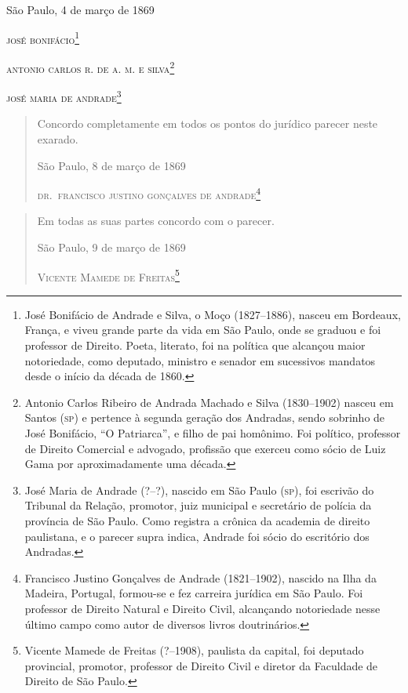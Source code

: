 \begin{flushright}
São Paulo, 4 de março de 1869

\textsc{josé bonifácio}\footnote{José Bonifácio de Andrade e Silva, o Moço
  (1827--1886), nasceu em Bordeaux, França, e viveu grande parte da vida
  em São Paulo, onde se graduou e foi professor de Direito. Poeta,
  literato, foi na política que alcançou maior notoriedade, como
  deputado, ministro e senador em sucessivos mandatos desde o início da
  década de 1860.}

\textsc{antonio carlos r. de a. m. e silva}\footnote{Antonio Carlos Ribeiro de
  Andrada Machado e Silva (1830--1902) nasceu em Santos (\textsc{sp}) e pertence à
  segunda geração dos Andradas, sendo sobrinho de José Bonifácio, ``O
  Patriarca'', e filho de pai homônimo. Foi político, professor de
  Direito Comercial e advogado, profissão que exerceu como sócio de Luiz
  Gama por aproximadamente uma década.}

\textsc{josé maria de andrade}\footnote{José Maria de Andrade (?--?),
  nascido em São Paulo (\textsc{sp}), foi escrivão do Tribunal da Relação,
  promotor, juiz municipal e secretário de polícia da província de São
  Paulo. Como registra a crônica da academia de direito paulistana, e o
  parecer supra indica, Andrade foi sócio do escritório dos Andradas.}
\end{flushright}

\begin{quote}
Concordo completamente em todos os pontos do jurídico parecer neste
exarado.

\begin{flushright}
São Paulo, 8 de março de 1869

\textsc{dr.~francisco justino gonçalves de andrade}\footnote{Francisco 
Justino Gonçalves de Andrade (1821--1902), nascido na Ilha da Madeira,
  Portugal, formou-se e fez carreira jurídica em São Paulo. Foi
  professor de Direito Natural e Direito Civil, alcançando notoriedade
  nesse último campo como autor de diversos livros doutrinários.}
  \end{flushright}
\end{quote}  

\begin{quote}
Em todas as suas partes concordo com o parecer.

\begin{flushright}
São Paulo, 9 de março de 1869

\textsc{Vicente Mamede de Freitas}\footnote{Vicente Mamede de Freitas
  (?--1908), paulista da capital, foi deputado provincial, promotor,
  professor de Direito Civil e diretor da Faculdade de Direito de São
  Paulo.}
  \end{flushright}
\end{quote}

